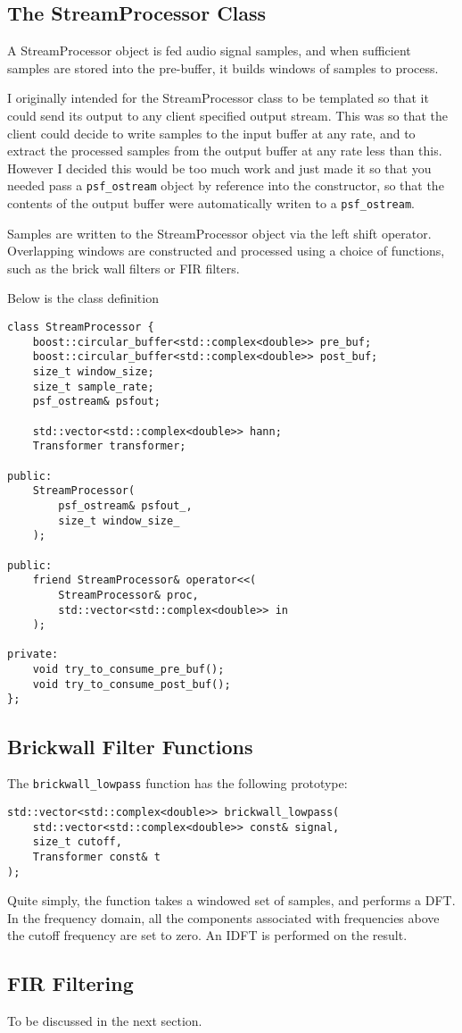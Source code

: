 \subsection{The StreamProcessor Class}
A StreamProcessor object is fed audio signal samples, and when sufficient samples
are stored into the pre-buffer, it builds windows of samples to process.

I originally intended for the StreamProcessor class to be templated so that 
it could send its output to any client specified output stream.
This was so that the client could decide to write samples to the input buffer
at any rate, and to extract the processed samples from the output buffer
at any rate less than this.
However I decided this would be too much work and just made it so that you 
needed pass a \verb|psf_ostream| object by reference into the constructor, so that
the contents of the output buffer were automatically writen to a \verb|psf_ostream|.

Samples are written to the StreamProcessor object via the left shift operator.
Overlapping windows are constructed and processed using a choice of functions,
such as the brick wall filters or FIR filters.

Below is the class definition
\begin{verbatim}
class StreamProcessor {
    boost::circular_buffer<std::complex<double>> pre_buf;
    boost::circular_buffer<std::complex<double>> post_buf;
    size_t window_size;
    size_t sample_rate;
    psf_ostream& psfout;

    std::vector<std::complex<double>> hann;
    Transformer transformer;

public:
    StreamProcessor(   
        psf_ostream& psfout_, 
        size_t window_size_
    );

public:
    friend StreamProcessor& operator<<(
        StreamProcessor& proc, 
        std::vector<std::complex<double>> in
    );

private:
    void try_to_consume_pre_buf();
    void try_to_consume_post_buf();
};
\end{verbatim}

\subsection{Brickwall Filter Functions}
The \verb|brickwall_lowpass| function has the following prototype:

\begin{verbatim}
std::vector<std::complex<double>> brickwall_lowpass(
    std::vector<std::complex<double>> const& signal,
    size_t cutoff,
    Transformer const& t
);
\end{verbatim}

Quite simply, the function takes a windowed set of samples, and performs a DFT.
In the frequency domain, all the components associated with frequencies above 
the cutoff frequency are set to zero.
An IDFT is performed on the result.


\subsection{FIR Filtering}
To be discussed in the next section.